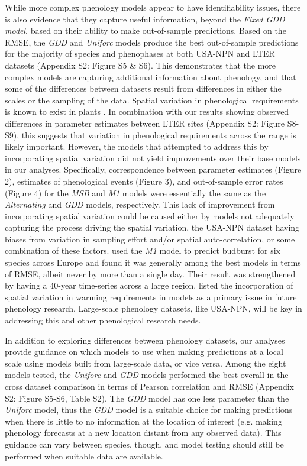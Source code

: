 \documentclass[fleqn,12pt,lineno]{article}
\begin{document}
While more complex phenology models appear to have identifiability issues, there is also evidence that they capture useful information, beyond the \textit{Fixed GDD model}, based on their ability to make out-of-sample predictions. Based on the RMSE, the \textit{GDD} and \textit{Uniforc} models produce the best out-of-sample predictions for the majority of species and phenophases at both USA-NPN and LTER datasets (Appendix S2: Figure S5 \& S6). This demonstrates that the more complex models are capturing additional information about phenology, and that some of the differences between datasets result from differences in either the scales or the sampling of the data. Spatial variation in phenological requirements is known to exist in plants \citep{zhang2017}. In combination with our results showing observed differences in parameter estimates between LTER sites (Appendix S2: Figure S8-S9), this suggests that variation in phenological requirements across the range is likely important. However, the models that attempted to address this by incorporating spatial variation did not yield improvements over their base models in our analyses. Specifically, correspondence between parameter estimates (Figure 2), estimates of phenological events (Figure 3), and out-of-sample error rates (Figure 4) for the \textit{MSB} and \textit{M1} models were essentially the same as the \textit{Alternating} and \textit{GDD} models, respectively. This lack of improvement from incorporating spatial variation could be caused either by models not adequately capturing the process driving the spatial variation, the USA-NPN dataset having biases from variation in sampling effort and/or spatial auto-correlation, or some combination of these factors. \cite{basler2016} used the \textit{M1} model to predict budburst for six species across Europe and found it was generally among the best models in terms of RMSE, albeit never by more than a single day. Their result was strengthened by having a 40-year time-series across a large region. \cite{chuine2017} listed the incorporation of spatial variation in warming requirements in models as a primary issue in future phenology research. Large-scale phenology datasets, like USA-NPN, will be key in addressing this and other phenological research needs.

In addition to exploring differences between phenology datasets, our analyses provide guidance on which models to use when making predictions at a local scale using models built from large-scale data, or vice versa. Among the eight models tested, the \textit{Uniforc} and \textit{GDD} models performed the best overall in the cross dataset comparison in terms of Pearson correlation and RMSE (Appendix S2: Figure S5-S6, Table S2). The \textit{GDD} model has one less parameter than the \textit{Uniforc} model, thus the \textit{GDD} model is a suitable choice for making predictions when there is little to no information at the location of interest (e.g. making phenology forecasts at a new location distant from any observed data). This guidance can vary between species, though, and model testing should still be performed when suitable data are available.
\end{document}
